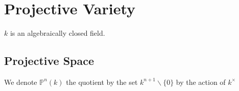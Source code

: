\documentclass[12pt,a4paper,english]{article}
\theoremstyle{plain}
\theoremstyle{definition}
\theoremstyle{remark}
\begin{document}
\section{Projective Variety}
$k$ is an algebraically closed field.
\subsection{Projective Space}
We denote $\mathbb{P}^{n}(k)$ the quotient by the set $k^{n+1}\backslash\{0\}$ by the action of $k^{\times}$ 












\newpage


\end{document}
